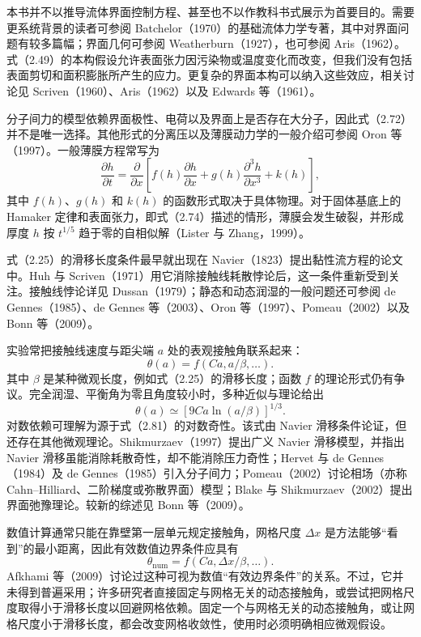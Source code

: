 \documentclass[11pt,a4paper,openany,fontset=none]{ctexbook}
\begin{document}
本书并不以推导流体界面控制方程、甚至也不以作教科书式展示为首要目的。需要更系统背景的读者可参阅 Batchelor（1970）的基础流体力学专著，其中对界面问题有较多篇幅；界面几何可参阅 Weatherburn（1927），也可参阅 Aris（1962）。式（2.49）的本构假设允许表面张力因污染物或温度变化而改变，但我们没有包括表面剪切和面积膨胀所产生的应力。更复杂的界面本构可以纳入这些效应，相关讨论见 Scriven（1960）、Aris（1962）以及 Edwards 等（1961）。

分子间力的模型依赖界面极性、电荷以及界面上是否存在大分子，因此式（2.72）并不是唯一选择。其他形式的分离压以及薄膜动力学的一般介绍可参阅 Oron 等（1997）。一般薄膜方程常写为
\begin{equation}
 \frac{\partial h}{\partial t}=\frac{\partial}{\partial x}\left[f(h)\frac{\partial h}{\partial x}
 +g(h)\frac{\partial^3h}{\partial x^3}+k(h)\right], \tag{2.82}
\end{equation}
其中 $f(h)$、$g(h)$ 和 $k(h)$ 的函数形式取决于具体物理。对于固体基底上的 Hamaker 定律和表面张力，即式（2.74）描述的情形，薄膜会发生破裂，并形成厚度 $h$ 按 $t^{1/5}$ 趋于零的自相似解（Lister 与 Zhang，1999）。

式（2.25）的滑移长度条件最早就出现在 Navier（1823）提出黏性流方程的论文中。Huh 与 Scriven（1971）用它消除接触线耗散悖论后，这一条件重新受到关注。接触线悖论详见 Dussan（1979）；静态和动态润湿的一般问题还可参阅 de Gennes（1985）、de Gennes 等（2003）、Oron 等（1997）、Pomeau（2002）以及 Bonn 等（2009）。

实验常把接触线速度与距尖端 $a$ 处的表观接触角联系起来：
\begin{equation}
 \theta(a)=f(Ca,a/\beta,\ldots). \tag{2.83}
\end{equation}
其中 $\beta$ 是某种微观长度，例如式（2.25）的滑移长度；函数 $f$ 的理论形式仍有争议。完全润湿、平衡角为零且角度较小时，多种近似与理论给出
\begin{equation}
 \theta(a)\simeq[9Ca\ln(a/\beta)]^{1/3}. \tag{2.84}
\end{equation}
对数依赖可理解为源于式（2.81）的对数奇性。该式由 Navier 滑移条件论证，但还存在其他微观理论。Shikmurzaev（1997）提出广义 Navier 滑移模型，并指出 Navier 滑移虽能消除耗散奇性，却不能消除压力奇性；Hervet 与 de Gennes（1984）及 de Gennes（1985）引入分子间力；Pomeau（2002）讨论相场（亦称 Cahn--Hilliard、二阶梯度或弥散界面）模型；Blake 与 Shikmurzaev（2002）提出界面弛豫理论。较新的综述见 Bonn 等（2009）。


数值计算通常只能在靠壁第一层单元规定接触角，网格尺度 $\Delta x$ 是方法能够“看到”的最小距离，因此有效数值边界条件应具有
\begin{equation}
 \theta_{\mathrm{num}}=f(Ca,\Delta x/\beta,\ldots). \tag{2.85}
\end{equation}
Afkhami 等（2009）讨论过这种可视为数值“有效边界条件”的关系。不过，它并未得到普遍采用；许多研究者直接固定与网格无关的动态接触角，或尝试把网格尺度取得小于滑移长度以回避网格依赖。固定一个与网格无关的动态接触角，或让网格尺度小于滑移长度，都会改变网格收敛性，使用时必须明确相应微观假设。
\end{document}

